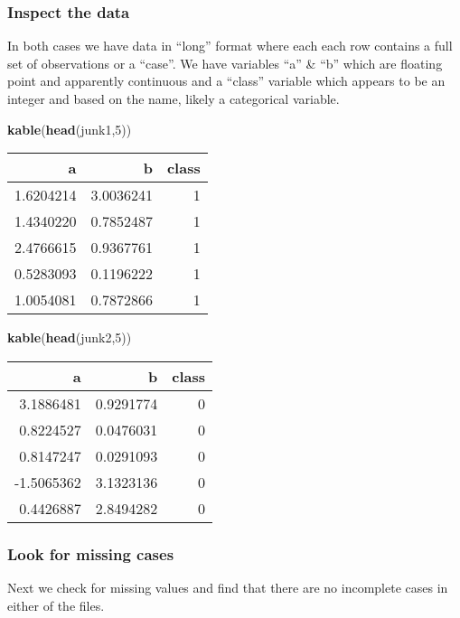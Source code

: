 \documentclass[]{article}
\newenvironment{Shaded}{\begin{snugshade}}{\end{snugshade}}
\newcommand{\KeywordTok}[1]{\textcolor[rgb]{0.13,0.29,0.53}{\textbf{#1}}}
\newcommand{\DecValTok}[1]{\textcolor[rgb]{0.00,0.00,0.81}{#1}}
\newcommand{\NormalTok}[1]{#1}
\begin{document}
\subsubsection{Inspect the data}\label{inspect-the-data}

In both cases we have data in ``long'' format where each each row
contains a full set of observations or a ``case''. We have variables
``a'' \& ``b'' which are floating point and apparently continuous and a
``class'' variable which appears to be an integer and based on the name,
likely a categorical variable.

\begin{Shaded}
\begin{Highlighting}[]
\KeywordTok{kable}\NormalTok{(}\KeywordTok{head}\NormalTok{(junk1,}\DecValTok{5}\NormalTok{))}
\end{Highlighting}
\end{Shaded}

\begin{longtable}[]{@{}rrr@{}}
\toprule
a & b & class\tabularnewline
\midrule
\endhead
1.6204214 & 3.0036241 & 1\tabularnewline
1.4340220 & 0.7852487 & 1\tabularnewline
2.4766615 & 0.9367761 & 1\tabularnewline
0.5283093 & 0.1196222 & 1\tabularnewline
1.0054081 & 0.7872866 & 1\tabularnewline
\bottomrule
\end{longtable}

\begin{Shaded}
\begin{Highlighting}[]
\KeywordTok{kable}\NormalTok{(}\KeywordTok{head}\NormalTok{(junk2,}\DecValTok{5}\NormalTok{))}
\end{Highlighting}
\end{Shaded}

\begin{longtable}[]{@{}rrr@{}}
\toprule
a & b & class\tabularnewline
\midrule
\endhead
3.1886481 & 0.9291774 & 0\tabularnewline
0.8224527 & 0.0476031 & 0\tabularnewline
0.8147247 & 0.0291093 & 0\tabularnewline
-1.5065362 & 3.1323136 & 0\tabularnewline
0.4426887 & 2.8494282 & 0\tabularnewline
\bottomrule
\end{longtable}

\subsubsection{Look for missing cases}\label{look-for-missing-cases}

Next we check for missing values and find that there are no incomplete
cases in either of the files.
\end{document}
